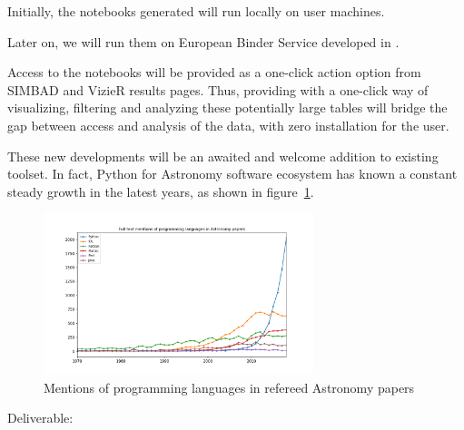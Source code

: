 \begin{task}[
  title=Astronomy application,
  id=astro,
  lead=CDS,
  PM=18,
  wphases={0-48},
  partners={CDS}
]
  Initially, the notebooks generated will run locally on user
  machines.

  Later on, we will run them on European Binder Service developed in .

  Access to the notebooks will be provided as a one-click action option from
  SIMBAD and VizieR results pages.
  Thus, providing with a one-click way of visualizing, filtering and analyzing
these potentially large tables will bridge the gap between access and analysis
of the data, with zero installation for the user.

  These new developments will be an awaited and welcome addition to existing
  toolset. In fact, Python for Astronomy software ecosystem has known a constant
    steady growth in the latest years, as shown in figure~\ref{fig:python-astro-citations}.

  \begin{figure}[ht]\centering
  \includegraphics[width=0.7\textwidth]{python-astro-citations.png}
  \caption{Mentions of programming languages in refereed Astronomy papers}\label{fig:python-astro-citations}
\end{figure}

Deliverable: 




\end{task}
